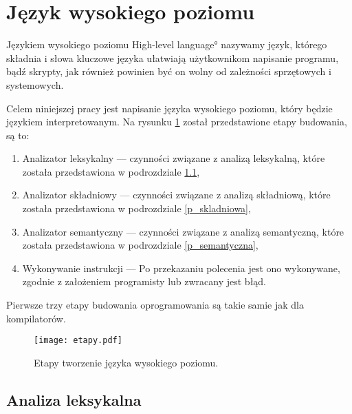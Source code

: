 \section{Język wysokiego poziomu }

Językiem wysokiego poziomu \ang{High-level language} nazywamy język, 
którego składnia i słowa kluczowe języka ułatwiają użytkownikom  napisanie programu, bądź skrypty,
jak również powinien być on wolny od zależności sprzętowych i systemowych.

Celem niniejszej pracy jest napisanie języka wysokiego poziomu, który będzie językiem interpretowanym.
Na rysunku \ref{fig:etapy} został przedstawione etapy budowania, są to:
\begin{enumerate}
 \item Analizator leksykalny  --- czynności związane z analizą leksykalną, które  została przedstawiona w podrozdziale  \ref{p_leksykalna},
 \item Analizator składniowy  --- czynności związane z analizą składniową, które  została przedstawiona w podrozdziale  \ref{p_skladniowa},
 \item Analizator semantyczny --- czynności związane z analizą semantyczną, które  została przedstawiona w podrozdziale \ref{p_semantyczna},
 \item Wykonywanie instrukcji --- Po przekazaniu polecenia jest ono wykonywane, zgodnie z założeniem programisty lub zwracany jest błąd.
\end{enumerate}
Pierwsze trzy etapy budowania oprogramowania są takie samie jak dla kompilatorów.\cite{aho}

 \begin{center}
\begin{figure}[H]
  \begin{center}
    \texttt{[image: etapy.pdf]}
  \end{center}
  \caption{Etapy tworzenie języka wysokiego poziomu. }
    \label{fig:etapy}
\end{figure}
\end{center}


\subsection{Analiza leksykalna} \label{p_leksykalna}

